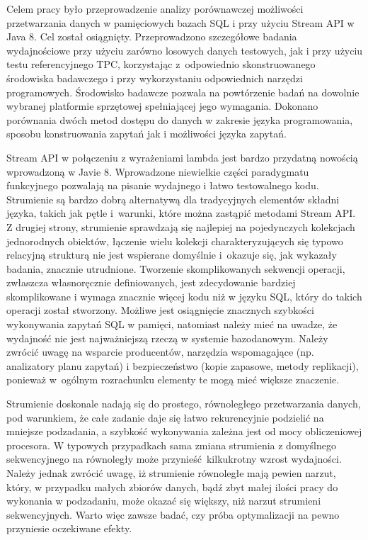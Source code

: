 \documentclass[12pt,twoside,openright]{extarticle}
\begin{document}
Celem pracy było przeprowadzenie analizy porównawczej możliwości przetwarzania danych w pamięciowych bazach SQL i przy użyciu Stream API w Java 8. Cel został osiągnięty. Przeprowadzono szczegółowe badania wydajnościowe przy użyciu zarówno losowych danych testowych, jak i przy użyciu testu referencyjnego TPC, korzystając z~odpowiednio skonstruowanego środowiska badawczego i przy wykorzystaniu odpowiednich narzędzi programowych. Środowisko badawcze pozwala na powtórzenie badań na dowolnie wybranej platformie sprzętowej spełniającej jego wymagania. Dokonano porównania dwóch metod dostępu do danych w zakresie języka programowania, sposobu konstruowania zapytań jak i możliwości języka zapytań.

    Stream API w połączeniu z wyrażeniami lambda jest bardzo przydatną nowością wprowadzoną w Javie 8. Wprowadzone niewielkie części paradygmatu funkcyjnego pozwalają na pisanie wydajnego i łatwo testowalnego kodu. Strumienie są bardzo dobrą alternatywą dla tradycyjnych elementów składni języka, takich jak pętle i~warunki, które można zastąpić metodami Stream API. Z drugiej strony, strumienie sprawdzają się najlepiej na pojedynczych kolekcjach jednorodnych obiektów, łączenie wielu kolekcji charakteryzujących się typowo relacyjną strukturą nie jest wspierane domyślnie i~okazuje się, jak wykazały badania, znacznie utrudnione. Tworzenie skomplikowanych sekwencji operacji, zwłaszcza własnoręcznie definiowanych, jest zdecydowanie bardziej skomplikowane i wymaga znacznie więcej kodu niż w języku SQL, który do takich operacji został stworzony. Możliwe jest osiągnięcie znacznych szybkości wykonywania zapytań SQL w pamięci, natomiast należy mieć na uwadze, że wydajność nie jest najważniejszą rzeczą w systemie bazodanowym. Należy zwrócić uwagę na wsparcie producentów, narzędzia wspomagające (np. analizatory planu zapytań) i bezpieczeństwo (kopie zapasowe, metody replikacji), ponieważ w~ogólnym rozrachunku elementy te mogą mieć większe znaczenie.

    Strumienie doskonale nadają się do prostego, równoległego przetwarzania danych, pod warunkiem, że całe zadanie daje się łatwo rekurencyjnie podzielić na mniejsze podzadania, a szybkość wykonywania zależna jest od mocy obliczeniowej procesora. W typowych przypadkach sama zmiana strumienia z domyślnego sekwencyjnego na równoległy może przynieść kilkukrotny wzrost wydajności. Należy jednak zwrócić uwagę, iż strumienie równoległe mają pewien narzut, który, w przypadku małych zbiorów danych, bądź zbyt małej ilości pracy do wykonania w podzadaniu, może okazać się większy, niż narzut strumieni sekwencyjnych. Warto więc zawsze badać, czy próba optymalizacji na pewno przyniesie oczekiwane efekty.
\end{document}
